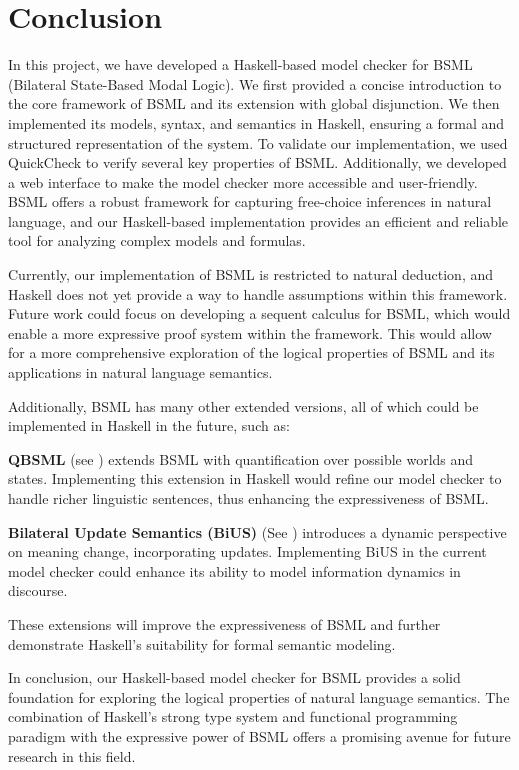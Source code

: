\section{Conclusion}\label{sec:Conclusion}

In this project, we have developed a Haskell-based model checker for BSML (Bilateral State-Based Modal Logic). 
We first provided a concise introduction to the core framework of BSML and its extension with global disjunction.
We then implemented its models, syntax, and semantics in Haskell, ensuring a formal and structured representation of the system.\@ 
To validate our implementation, we used QuickCheck to verify several key properties of BSML.\@
Additionally, we developed a web interface to make the model checker more accessible and user-friendly.
BSML offers a robust framework for capturing free-choice inferences in natural language,
and our Haskell-based implementation provides an efficient and reliable tool for analyzing complex models and formulas.


Currently, our implementation of BSML is restricted to natural deduction, and Haskell does not yet provide a way to handle assumptions within this framework.
Future work could focus on developing a sequent calculus for BSML, which would enable a more expressive proof system within the framework.
This would allow for a more comprehensive exploration of the logical properties of BSML and its applications in natural language semantics.

Additionally, BSML has many other extended versions, all of which could be implemented in Haskell in the future, such as:

\textbf{QBSML} (see \cite{Aloni2023}) extends BSML with quantification over possible worlds and states. Implementing this extension in Haskell would refine our model checker to handle richer linguistic sentences, thus enhancing the expressiveness of BSML.\@

\textbf{Bilateral Update Semantics (BiUS)} (See \cite{BiUS2023}) introduces a dynamic perspective on meaning change, incorporating updates. Implementing BiUS in the current model checker could enhance its ability to model information dynamics in discourse.

These extensions will improve the expressiveness of BSML and further demonstrate Haskell's suitability for formal semantic modeling.

In conclusion, our Haskell-based model checker for BSML provides a solid foundation for exploring the logical properties of natural language semantics.
The combination of Haskell's strong type system and functional programming paradigm with the expressive power of BSML offers a promising avenue for future research in this field.
